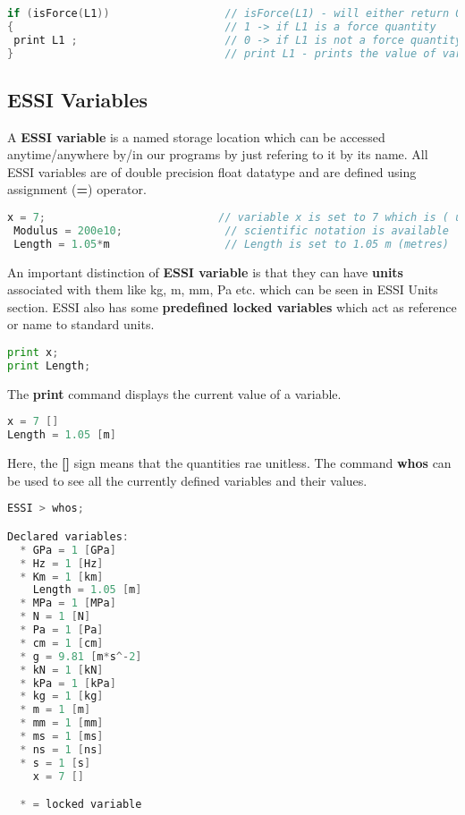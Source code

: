 \documentclass{article}
\begin{document}
\begin{lstlisting}[language=C]
if (isForce(L1))                  // isForce(L1) - will either return 0 or 1
{                                 // 1 -> if L1 is a force quantity
 print L1 ;                       // 0 -> if L1 is not a force quantity
}                                 // print L1 - prints the value of variable L1
\end{lstlisting}

\subsection{ESSI Variables}

A \textbf{ESSI variable} is a named storage location which can be accessed anytime/anywhere by/in our programs by just refering to it by its name. All ESSI variables are of double precision float datatype and are defined using assignment (\textbf{=}) operator.

\begin{lstlisting}[language=C]
 x = 7;                           // variable x is set to 7 which is ( unitless )
 Modulus = 200e10;                // scientific notation is available
 Length = 1.05*m                  // Length is set to 1.05 m (metres)
\end{lstlisting}

\noindent An important distinction of  \textbf{ESSI variable} is that they can have \textbf{units} associated with them like kg, m, mm, Pa etc. which can be seen in ESSI Units section.
ESSI also has some \textbf{predefined locked variables} which act as reference or name to standard units.

\begin{lstlisting}[language=Python]
print x;
print Length;
\end{lstlisting}

\noindent The \textbf{print} command displays the current value of a variable.

\begin{lstlisting}[language=C,backgroundcolor=\color{grayish}]
x = 7 []
Length = 1.05 [m]
\end{lstlisting}

\noindent Here, the \textbf{[]} sign means that the quantities rae unitless. The command \textbf{whos} can be used to see all the currently defined variables and their values.

\begin{lstlisting}[language=C,backgroundcolor=\color{grayish}]
ESSI > whos;

Declared variables:
  * GPa = 1 [GPa]
  * Hz = 1 [Hz]
  * Km = 1 [km]
    Length = 1.05 [m]
  * MPa = 1 [MPa]
  * N = 1 [N]
  * Pa = 1 [Pa]
  * cm = 1 [cm]
  * g = 9.81 [m*s^-2]
  * kN = 1 [kN]
  * kPa = 1 [kPa]
  * kg = 1 [kg]
  * m = 1 [m]
  * mm = 1 [mm]
  * ms = 1 [ms]
  * ns = 1 [ns]
  * s = 1 [s]
    x = 7 []

  * = locked variable
\end{lstlisting}
\end{document}
